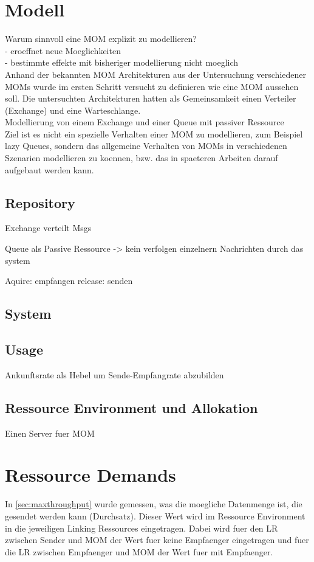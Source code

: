 \section{Modell}
Warum sinnvoll eine MOM explizit zu modellieren? \\
- eroeffnet neue Moeglichkeiten \\
- bestimmte effekte mit bisheriger modellierung nicht moeglich\\
Anhand der bekannten MOM Architekturen aus der Untersuchung verschiedener MOMs wurde im ersten Schritt versucht zu definieren wie eine MOM aussehen soll. Die untersuchten Architekturen hatten als Gemeinsamkeit einen Verteiler (Exchange) und eine Warteschlange. \\
Modellierung von einem Exchange und einer Queue mit passiver Ressource \\
Ziel ist es nicht ein spezielle Verhalten einer MOM zu modellieren, zum Beispiel lazy Queues, sondern das allgemeine Verhalten von MOMs in verschiedenen Szenarien modellieren zu koennen, bzw. das in spaeteren Arbeiten darauf aufgebaut werden kann.
\subsection{Repository}
Exchange verteilt Msgs

Queue als Passive Ressource -> kein verfolgen einzelnern Nachrichten durch das system

Aquire: empfangen
release: senden

\subsection{System}

\subsection{Usage}
Ankunftsrate als Hebel um Sende-Empfangrate abzubilden
\subsection{Ressource Environment und Allokation}
Einen Server fuer MOM

\section{Ressource Demands}
In \autoref{sec:maxthroughput} wurde gemessen, was die moegliche Datenmenge ist, die gesendet werden kann (Durchsatz). Dieser Wert wird im Ressource Environment in die jeweiligen Linking Ressources eingetragen. Dabei wird fuer den LR zwischen Sender und MOM der Wert fuer keine Empfaenger eingetragen und fuer die LR zwischen Empfaenger und MOM der Wert fuer mit Empfaenger. \\

